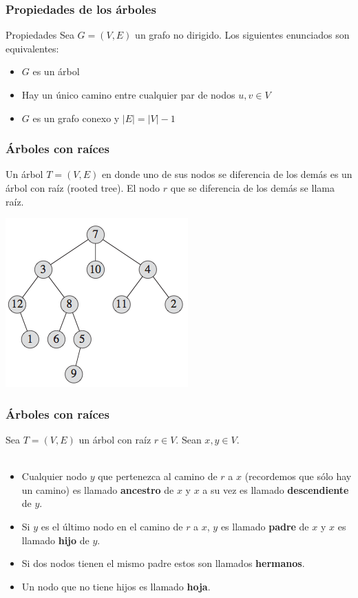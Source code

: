 \documentclass{beamer}
\begin{document}
	\begin{frame}
		\frametitle{Propiedades de los árboles}
		\begin{block}{Propiedades}
			Sea $G = (V, E)$ un grafo no dirigido. Los siguientes enunciados son equivalentes:
			\begin{itemize}
				\item $G$ es un árbol
				\item Hay un único camino entre cualquier par de nodos $u, v \in V$
				\item $G$ es un grafo conexo y $|E| = |V| - 1$
			\end{itemize}
		\end{block}
	\end{frame}
	
	\begin{frame}
		\frametitle{Árboles con raíces}
		Un árbol $T = (V, E)$ en donde uno de sus nodos se diferencia de los demás es un árbol con raíz (rooted tree). El nodo $r$ que se diferencia de los demás se llama raíz.\\
		\begin{center} \includegraphics[height = 0.55\textheight]{RootedTree.png}  \end{center}
	\end{frame}
	
	\begin{frame}
		\frametitle{Árboles con raíces}
		Sea $T = (V, E)$ un árbol con raíz $r \in V$. Sean $x, y \in V$. \\ \quad \\
		\begin{itemize}
			\item Cualquier nodo $y$ que pertenezca al camino de $r$ a $x$ (recordemos que sólo hay un camino) es llamado \textbf{ancestro} de $x$ y $x$ a su vez es llamado \textbf{descendiente} de $y$.
			\item Si $y$ es el último nodo en el camino de $r$ a $x$, $y$ es llamado \textbf{padre} de $x$ y $x$ es llamado \textbf{hijo} de $y$.
			\item Si dos nodos tienen el mismo padre estos son llamados \textbf{hermanos}.
			\item Un nodo que no tiene hijos es llamado \textbf{hoja}.
		\end{itemize}
	\end{frame}
	
\end{document}
